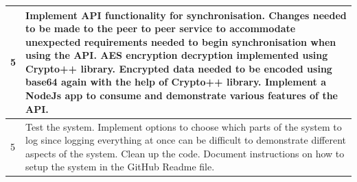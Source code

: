 \begin{enumerate}
\begin{table}[h]
\begin{tabular}{|p{1cm}|p{12cm}|}
\hline 5 & Implement API functionality for synchronisation. Changes needed to be made to the peer to peer service to accommodate unexpected requirements needed to begin synchronisation when using the API. AES encryption decryption implemented using Crypto++ \cite{cryptopp} library. Encrypted data needed to be encoded using base64 again with the help of Crypto++ library. Implement a NodeJs app to consume and demonstrate various features of the API.\\ [12pt]

\hline 5 & Test the system. Implement options to choose which parts of the system to log since logging everything at once can be difficult to demonstrate different aspects of the system. Clean up the code. Document instructions on how to setup the system in the GitHub Readme file. \\ [12pt]

\hline
\end{tabular} \\
\label{tab:ProjRisks}
\end{table}

\FloatBarrier



\end{enumerate}
